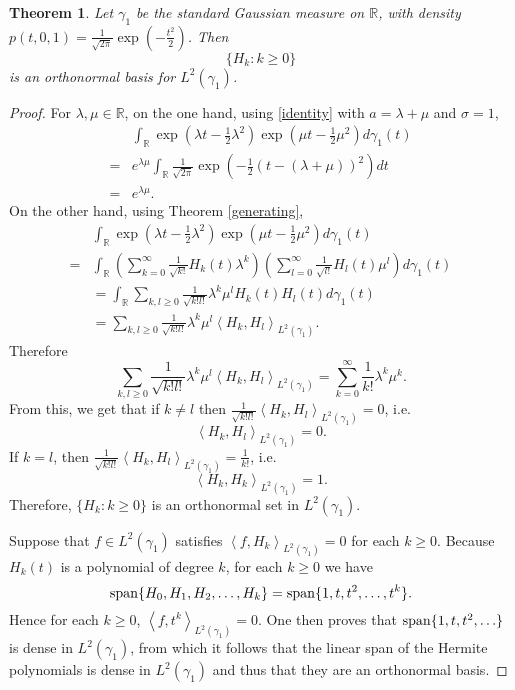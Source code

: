 \documentclass{article}
\newcommand{\inner}[2]{\left\langle #1, #2 \right\rangle}
\newcommand{\Span}{\ensuremath\mathrm{span}}
\newtheorem{theorem}{Theorem}
\theoremstyle{definition}
\begin{document}
\begin{theorem}
Let $\gamma_1$ be the standard Gaussian measure on $\mathbb{R}$, with density
$p(t,0,1)= \frac{1}{\sqrt{2\pi}}  \exp\left( - \frac{t^2}{2} \right)$. Then
\[
\{H_k: k \geq 0\}
\]
is an orthonormal basis for $L^2(\gamma_1)$.
\end{theorem}
\begin{proof}
For $\lambda,\mu \in \mathbb{R}$, on the one hand, using \eqref{identity} with $a=\lambda+\mu$ and $\sigma=1$,
\[
\begin{split}
&\int_{\mathbb{R}} \exp\left(\lambda t-\frac{1}{2}\lambda^2\right) \exp\left(\mu t-\frac{1}{2}\mu^2\right) d\gamma_1(t)\\
=&e^{\lambda \mu} \int_{\mathbb{R}} \frac{1}{\sqrt{2\pi}} \exp\left(-\frac{1}{2}(t-(\lambda+\mu))^2 \right) dt\\
=&e^{\lambda \mu}.
\end{split}
\]
On the other hand,  using Theorem \ref{generating},
\[
\begin{split}
&\int_{\mathbb{R}} \exp\left(\lambda t-\frac{1}{2}\lambda^2\right) \exp\left(\mu t-\frac{1}{2}\mu^2\right) d\gamma_1(t)\\
=&\int_{\mathbb{R}} \left( \sum_{k=0}^\infty  \frac{1}{\sqrt{k!}} H_k(t) \lambda^k\right)
\left(\sum_{l=0}^\infty  \frac{1}{\sqrt{l!}} H_l(t) \mu^l\right) d\gamma_1(t)\\
&=\int_{\mathbb{R}} \sum_{k, l \geq 0} \frac{1}{\sqrt{k! l!}} \lambda^k \mu^l H_k(t) H_l(t) d\gamma_1(t)\\
&=\sum_{k,l \geq 0} \frac{1}{\sqrt{k! l!}}  \lambda^k \mu^l \inner{H_k}{H_l}_{L^2(\gamma_1)}.
\end{split}
\]
Therefore
\[
\sum_{k,l \geq 0} \frac{1}{\sqrt{k! l!}}  \lambda^k \mu^l \inner{H_k}{H_l}_{L^2(\gamma_1)} = \sum_{k=0}^\infty \frac{1}{k!} \lambda^k \mu^k.
\]
From this, we get that if $k \neq l$ then 
$\frac{1}{\sqrt{k! l!}}  \inner{H_k}{H_l}_{L^2(\gamma_1)} = 0$,
i.e.
\[
\inner{H_k}{H_l}_{L^2(\gamma_1)}=0.
\]
 If $k=l$, then
$\frac{1}{\sqrt{k! l!}}  \inner{H_k}{H_l}_{L^2(\gamma_1)} = \frac{1}{k!}$, i.e.
\[
\inner{H_k}{H_k}_{L^2(\gamma_1)}=1.
\]
Therefore, $\{H_k: k \geq 0\}$ is an orthonormal set in $L^2(\gamma_1)$. 

Suppose that $f \in L^2(\gamma_1)$ satisfies $\inner{f}{H_k}_{L^2(\gamma_1)}=0$ for each
$k \geq 0$. 
Because $H_k(t)$ is a polynomial of  degree $k$,  for each $k \geq 0$ we have
\[
\Span\{H_0,H_1,H_2,\ldots,H_k\} = \Span\{1,t,t^2,\ldots,t^k\}.
\]
Hence for each $k \geq 0$, $\inner{f}{t^k}_{L^2(\gamma_1)}=0$. 
One then proves that $\Span\{1,t,t^2,\ldots\}$ is dense in $L^2(\gamma_1)$, from which it follows that
the linear span of the Hermite polynomials is dense in $L^2(\gamma_1)$ and thus that they are an orthonormal basis.
\end{proof}
\end{document}
